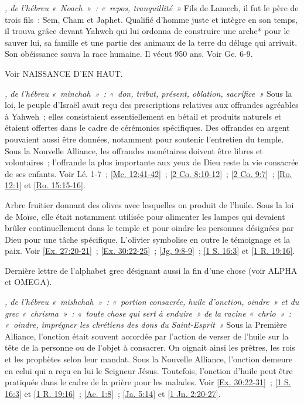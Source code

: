 \begin{multicols}{2}
\textit{, de l'hébreu «~Noach~»~: «~repos, tranquillité~»}\newline
Fils de Lamech, il fut le père de trois fils~: Sem, Cham et Japhet. Qualifié d'homme juste et intègre en son temps, il trouva grâce devant Yahweh qui lui ordonna de construire une arche* pour le sauver lui, sa famille et une partie des animaux de la terre du déluge qui arrivait. Son obéissance sauva la race humaine. Il vécut 950 ans. Voir Ge. 6-9.

\textit{}\newline
Voir NAISSANCE D'EN HAUT.

\textit{, de l'hébreu «~minchah~»~: «~don, tribut, présent, oblation, sacrifice~»}\newline
Sous la loi, le peuple d'Israël avait reçu des prescriptions relatives aux offrandes agréables à Yahweh~; elles consistaient essentiellement en bétail et produits naturels et étaient offertes dans le cadre de cérémonies spécifiques. Des offrandes en argent pouvaient aussi être données, notamment pour soutenir l'entretien du temple. Sous la Nouvelle Alliance, les offrandes monétaires doivent être libres et volontaires~; l'offrande la plus importante aux yeux de Dieu reste la vie consacrée de ses enfants. Voir Lé. 1-7~; \vref{Mc. 12:41-42}~; \vref{2 Co. 8:10-12}~; \vref{2 Co. 9:7}~; \vref{Ro. 12:1} et \vref{Ro. 15:15-16}.

\textit{}\newline
Arbre fruitier donnant des olives avec lesquelles on produit de l'huile. Sous la loi de Moïse, elle était notamment utilisée pour alimenter les lampes qui devaient brûler continuellement dans le temple et pour oindre les personnes désignées par Dieu pour une tâche spécifique. L'olivier symbolise en outre le témoignage et la paix. Voir \vref{Ex. 27:20-21}~; \vref{Ex. 30:22-25}~; \vref{Jg. 9:8-9}~; \vref{1 S. 16:3} et \vref{1 R. 19:16}.

\textit{}\newline
Dernière lettre de l'alphabet grec désignant aussi la fin d'une chose (voir ALPHA et OMEGA).

\textit{, de l'hébreu «~mishchah~»~: «~portion consacrée, huile d'onction, oindre~» et du grec «~chrisma~»~: «~toute chose qui sert à enduire~» de la racine «~chrio~»~: «~oindre, imprégner les chrétiens des dons du Saint-Esprit~»}\newline
Sous la Première Alliance, l'onction était souvent accordée par l'action de verser de l'huile sur la tête de la personne ou de l'objet à consacrer. On oignait ainsi les prêtres, les rois et les prophètes selon leur mandat. Sous la Nouvelle Alliance, l'onction demeure en celui qui a reçu en lui le Seigneur Jésus. Toutefois, l'onction d'huile peut être pratiquée dans le cadre de la prière pour les malades. Voir \vref{Ex. 30:22-31}~; \vref{1 S. 16:3} et \vref{1 R. 19:16}~; \vref{Ac. 1:8}~; \vref{Ja. 5:14} et \vref{1 Jn. 2:20-27}.


\end{multicols}
